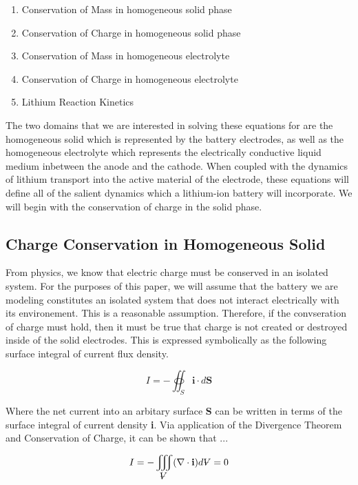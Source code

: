\documentclass[lettersize,journal]{IEEEtran}
\newcommand{\volume}{{\ooalign{\hfil$V$\hfil\cr\kern0.08em--\hfil\cr}}}
\begin{document}
 \begin{enumerate}
   \item Conservation of Mass in homogeneous solid phase
   \item Conservation of Charge in homogeneous solid phase
   \item Conservation of Mass in homogeneous electrolyte
   \item Conservation of Charge in homogeneous electrolyte
   \item Lithium Reaction Kinetics \\
  \end{enumerate}

The two domains that we are interested in solving these equations for are the homogeneous solid which is represented by the battery electrodes, as well as the homogeneous electrolyte which represents the electrically conductive liquid medium inbetween the anode and the cathode. When coupled with the dynamics of lithium transport into the active material of the electrode, these equations will define all of the salient dynamics which a lithium-ion battery will incorporate. We will begin with the conservation of charge in the solid phase.

\subsection{Charge Conservation in Homogeneous Solid}

From physics, we know that electric charge must be conserved in an isolated system. For the purposes of this paper, we will assume that the battery we are modeling constitutes an isolated system that does not interact electrically with its environement. This is a reasonable assumption. Therefore, if the convseration of charge must hold, then it must be true that charge is not created or destroyed inside of the solid electrodes. This is expressed symbolically as the following surface integral of current flux density.

\begin{equation}
 I = - \oiint_S \textbf{i} \cdot d \textbf{S}
\end{equation}

\noindent Where the net current into an arbitary surface \textbf{S} can be written in terms of the surface integral of current density \textbf{i}. Via application of the Divergence Theorem and Conservation of Charge, it can be shown that ...

\begin{equation}
    I = - \iiint_{\volume} (\nabla \cdot \textbf{i})d{\volume} = 0
\end{equation}
\end{document}
